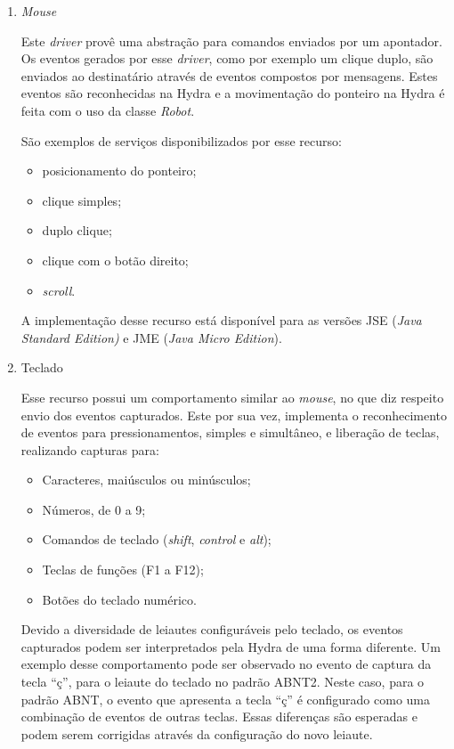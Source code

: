 	\begin{enumerate}
	  \item \textit{Mouse}
		
			Este \textit{driver} provê uma abstração para comandos enviados por um apontador. Os eventos
			gerados por esse \textit{driver}, como por exemplo um clique duplo, são enviados ao destinatário
			através de eventos compostos por mensagens. Estes eventos são reconhecidas na Hydra e a
			movimentação do ponteiro na Hydra é feita com o uso da classe \textit{Robot}.
			
			São exemplos de serviços disponibilizados por esse recurso: 
			\begin{itemize}
			  \item posicionamento do ponteiro;
			  \item clique simples;
			  \item duplo clique;
			  \item clique com o botão direito;
			  \item	\textit{scroll}. 
			\end{itemize}
		
	  		A implementação desse recurso está disponível para as versões JSE (\textit{Java Standard Edition)} 
	  		e JME (\textit{Java Micro Edition}).

	  \item Teclado
	  		
	  		Esse recurso possui um comportamento similar ao \textit{mouse}, no que diz respeito
	  		envio dos eventos capturados. Este por sua vez, implementa o reconhecimento de
	  		eventos para pressionamentos, simples e simultâneo, e liberação de teclas, realizando
	  		capturas para:
	  		
	  		\begin{itemize}
	  		  \item Caracteres, maiúsculos ou minúsculos;
	  		  \item Números, de 0 a 9;
	  		  \item Comandos de teclado (\textit{shift}, \textit{control} e \textit{alt});
	  		  \item Teclas de funções  (F1 a F12);
	  		  \item Botões do teclado numérico.
	  		\end{itemize}
	
	  		Devido a diversidade de leiautes  configuráveis pelo teclado, os eventos capturados podem ser
	  		interpretados pela Hydra de uma forma diferente. Um exemplo desse comportamento pode ser
	  		observado no evento de captura da tecla ``ç'', para o leiaute do teclado no padrão ABNT2.
	  		Neste caso, para o padrão ABNT, o evento que apresenta a tecla ``ç'' é configurado como uma
	  		combinação de eventos de outras teclas. Essas diferenças são esperadas e podem serem corrigidas
	  		através da configuração do novo leiaute.
	  		

\end{enumerate}
